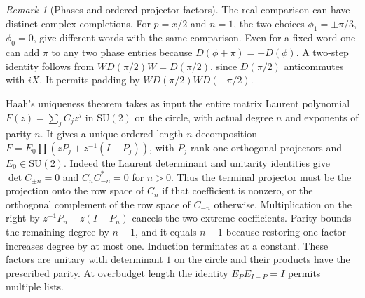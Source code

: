 \documentclass[11pt,reqno]{amsart}
\theoremstyle{definition}
\theoremstyle{remark}
\newtheorem{remark}[theorem]{Remark}
\numberwithin{equation}{section}
\newcommand{\SU}{\mathrm{SU}}
\begin{document}
\begin{remark}[Phases and ordered projector factors]\label{m4:phases}
The real comparison can have distinct complex completions. For $p=x/2$ and $n=1$, the two choices $\phi_1=\pm\pi/3$, $\phi_0=0$, give different words with the same comparison. Even for a fixed word one can add $\pi$ to any two phase entries because $D(\phi+\pi)=-D(\phi)$. A two-step identity follows from $WD(\pi/2)W=D(\pi/2)$, since $D(\pi/2)$ anticommutes with $iX$. It permits padding by $WD(\pi/2)WD(-\pi/2)$.

Haah's uniqueness theorem \cite[Definition 1 and Theorem 2, arXiv v4]{m4:Haah} takes as input the entire matrix Laurent polynomial $F(z)=\sum_j C_jz^j$ in $\SU(2)$ on the circle, with actual degree $n$ and exponents of parity $n$. It gives a unique ordered length-$n$ decomposition $F=E_0\prod (zP_j+z^{-1}(I-P_j))$, with $P_j$ rank-one orthogonal projectors and $E_0\in\SU(2)$. Indeed the Laurent determinant and unitarity identities give $\det C_{\pm n}=0$ and $C_n C_{-n}^*=0$ for $n>0$. Thus the terminal projector must be the projection onto the row space of $C_n$ if that coefficient is nonzero, or the orthogonal complement of the row space of $C_{-n}$ otherwise. Multiplication on the right by $z^{-1}P_n+z(I-P_n)$ cancels the two extreme coefficients. Parity bounds the remaining degree by $n-1$, and it equals $n-1$ because restoring one factor increases degree by at most one. Induction terminates at a constant. These factors are unitary with determinant $1$ on the circle and their products have the prescribed parity. At overbudget length the identity $E_P E_{I-P}=I$ permits multiple lists.
\end{remark}
\end{document}
